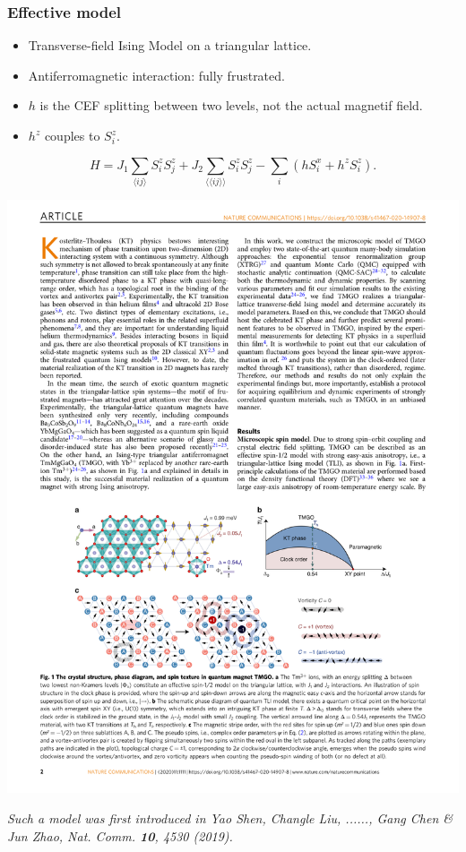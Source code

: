 \documentclass[xcolor=table, aspectratio=1610,ignorenonframetext]{beamer}
\begin{document}
\begin{frame}
  \frametitle{Effective model}
  \begin{itemize}
  \item Transverse-field Ising Model on a triangular lattice.
  \item Antiferromagnetic interaction: fully frustrated.
  \item $h$ is the CEF splitting between two levels, not the actual magnetif field.
  \item $h^z$ couples to $S_i^z$.
  \end{itemize}
  \[H = J_1\sum_{\langle ij\rangle}S_i^zS_j^z +J_2\sum_{\langle\langle ij\rangle\rangle}S_i^zS_j^z - \sum_i\left(hS_i^x + h^zS_i^z\right). \]

  \begin{center}
    \includegraphics{lattice-afm}
  \end{center}
  \emph{\small Such a model was first introduced in Yao Shen, Changle Liu, ......, Gang Chen \& Jun Zhao, Nat. Comm. \textbf{10}, 4530 (2019).}
\end{frame}
\end{document}
